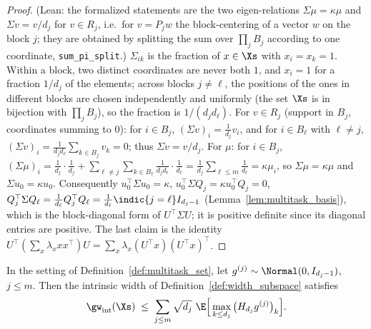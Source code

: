 \begin{proof}
\leanok
{}
(Lean: the formalized statements are the two eigen-relations $\Sigma\mu = \kappa\mu$ and
$\Sigma v = v/d_j$ for $v \in R_j$, i.e.\ for $v = P_jw$ the block-centering of a vector $w$
on the block $j$; they are obtained by splitting the sum over $\prod_jB_j$ according to one
coordinate, \texttt{sum\_pi\_split}.)
$\Sigma_{ik}$ is the fraction of $x \in \Xs$ with $x_i = x_k = 1$. Within a block, two
distinct coordinates are never both $1$, and $x_i = 1$ for a fraction $1/d_j$ of the
elements; across blocks $j \ne \ell$, the positions of the ones in different blocks are
chosen independently and uniformly (the set $\Xs$ is in bijection with $\prod_j B_j$), so the
fraction is $1/(d_jd_\ell)$. For $v \in R_j$ (support in $B_j$, coordinates summing to $0$):
for $i \in B_j$, $(\Sigma v)_i = \frac{1}{d_j}v_i$, and for $i \in B_\ell$ with
$\ell\ne j$, $(\Sigma v)_i = \frac{1}{d_jd_\ell}\sum_{k\in B_j}v_k = 0$; thus
$\Sigma v = v/d_j$. For $\mu$: for $i \in B_j$,
$(\Sigma\mu)_i = \frac{1}{d_j}\cdot\frac{1}{d_j} + \sum_{\ell\ne j}\sum_{k\in B_\ell}\frac{1}{d_jd_\ell}\cdot\frac1{d_\ell}
= \frac{1}{d_j}\sum_{\ell\le m}\frac{1}{d_\ell} = \kappa\mu_i$, so $\Sigma\mu = \kappa\mu$ and
$\Sigma u_0 = \kappa u_0$. Consequently $u_0^\top\Sigma u_0 = \kappa$,
$u_0^\top\Sigma Q_j = \kappa u_0^\top Q_j = 0$, $Q_j^\top\Sigma Q_\ell = \frac{1}{d_\ell}Q_j^\top Q_\ell
= \frac{1}{d_\ell}\indic\{j=\ell\}I_{d_j-1}$ (Lemma~\ref{lem:multitask_basis}), which is the
block-diagonal form of $U^\top\Sigma U$; it is positive definite since its diagonal entries
are positive. The last claim is the identity $U^\top(\sum_x\lambda_x xx^\top)U =
\sum_x\lambda_x(U^\top x)(U^\top x)^\top$.
\end{proof}

\begin{lemma}\label{lem:multitask_width_reduction}
\leanok
{}
In the setting of Definition~\ref{def:multitask_set}, let $g^{(j)} \sim \Normal(0, I_{d_j-1})$,
$j \le m$. Then the intrinsic width of Definition~\ref{def:width_subspace} satisfies
\[
  \gw_{\mathrm{int}}(\Xs) \;\le\; \sum_{j\le m}\sqrt{d_j}\ \E\Big[\max_{k \le d_j}\big(H_{d_j}g^{(j)}\big)_k\Big].
\]
\end{lemma}

